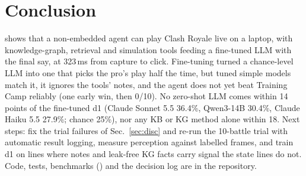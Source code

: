 \section{Conclusion}
\label{sec:concl}

\cb{} shows that a non-embedded agent can play Clash Royale live on a laptop, with knowledge-graph, retrieval and simulation tools feeding a fine-tuned LLM with the final say, at 323\,ms from capture to click. Fine-tuning turned a chance-level LLM into one that picks the pro's play half the time, but tuned simple models match it, it ignores the tools' notes, and the agent does not yet beat Training Camp reliably (one early win, then 0/10). No zero-shot LLM comes within 14 points of the fine-tuned d1 (Claude Sonnet 5.5 36.4\%, Qwen3-14B 30.4\%, Claude Haiku 5.5 27.9\%; chance 25\%), nor any KB or KG method alone within 18. %
Next steps: fix the trial failures of Sec.~\ref{sec:disc} and re-run the 10-battle trial with automatic result logging, measure perception against labelled frames, and train d1 on lines where notes and leak-free KG facts carry signal the state lines do not. Code, tests, benchmarks () and the decision log are in the repository. %

